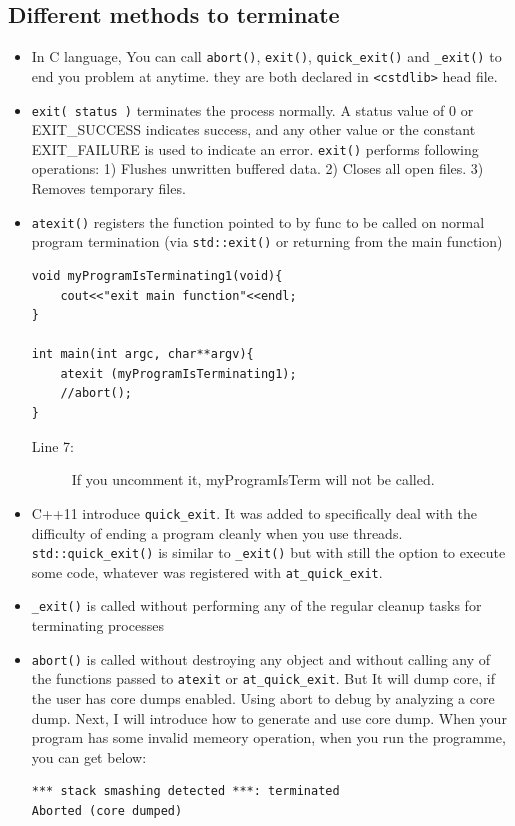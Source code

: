\documentclass[a4paper,11pt,twoside]{book}
\begin{document}
\subsection{Different methods to terminate}
\begin{itemize}
	\item In C language, You can call \texttt{abort()}, \texttt{exit()}, \texttt{quick\_exit()} and  \texttt{\_exit()} to end you problem at anytime. they are both declared in \texttt{<cstdlib>} head file.
	
	\item \texttt{exit( status )} terminates the process normally. A status value of 0 or EXIT\_SUCCESS indicates success, and any other value or the constant EXIT\_FAILURE is used to indicate an error. \texttt{exit()} performs following operations: 1) Flushes unwritten buffered data. 2) Closes all open files. 3) Removes temporary files.
	
	\item \texttt{atexit()} registers the function pointed to by func to be called on normal program termination (via \texttt{std::exit()} or returning from the main function)
\begin{lstlisting}[]
void myProgramIsTerminating1(void){
	cout<<"exit main function"<<endl;
}
	
int main(int argc, char**argv){
	atexit (myProgramIsTerminating1);
	//abort(); 
}
\end{lstlisting}
\begin{description}
	\item[Line 7:] If you uncomment it, myProgramIsTerm will not be called.
\end{description}
	

	\item C++11 introduce \texttt{quick\_exit}. It was added to specifically deal with the difficulty of ending a program cleanly when you use threads. \texttt{std::quick\_exit()} is similar to \texttt{\_exit()} but with still the option to execute some code, whatever was registered with \texttt{at\_quick\_exit}.
	
	\item \texttt{\_exit()} is called without performing any of the regular cleanup tasks for terminating processes
	
	\item \texttt{abort()} is called without destroying any object and without calling any of the functions passed to \texttt{atexit} or \texttt{at\_quick\_exit}. But It will dump core, if the user has core dumps enabled. Using abort to debug by analyzing a core dump. Next, I will introduce how to generate and use core dump. When your program has some invalid memeory operation, when you run the programme, you can get below:
\begin{lstlisting}[]
*** stack smashing detected ***: terminated
Aborted (core dumped)
\end{lstlisting}


\end{itemize}
\end{document}
